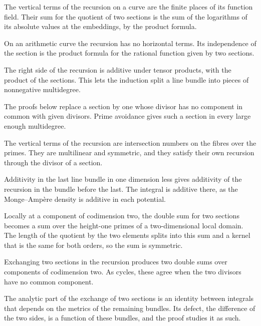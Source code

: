 The vertical terms of the recursion on a curve are the finite places of its function field. Their sum for the
quotient of two sections is the sum of the logarithms of its absolute values at the embeddings, by the product
formula.

On an arithmetic curve the recursion has no horizontal terms. Its independence of the section is the product formula
for the rational function given by two sections.

The right side of the recursion is additive under tensor products, with the product of the sections. This lets the
induction split a line bundle into pieces of nonnegative multidegree.

The proofs below replace a section by one whose divisor has no component in common with given divisors. Prime
avoidance gives such a section in every large enough multidegree.

The vertical terms of the recursion are intersection numbers on the fibres over the primes. They are multilinear and
symmetric, and they satisfy their own recursion through the divisor of a section.

Additivity in the last line bundle in one dimension less gives additivity of the recursion in the bundle before the
last. The integral is additive there, as the Monge--Amp\`ere density is additive in each potential.

Locally at a component of codimension two, the double sum for two sections becomes a sum over the height-one primes of a
two-dimensional local domain. The length of the quotient by the two elements splits into this sum and a kernel that is
the same for both orders, so the sum is symmetric.

Exchanging two sections in the recursion produces two double sums over components of codimension two. As cycles,
these agree when the two divisors have no common component.

The analytic part of the exchange of two sections is an identity between integrals that depends on the metrics of the
remaining bundles. Its defect, the difference of the two sides, is a function of these bundles, and the proof studies it
as such.

